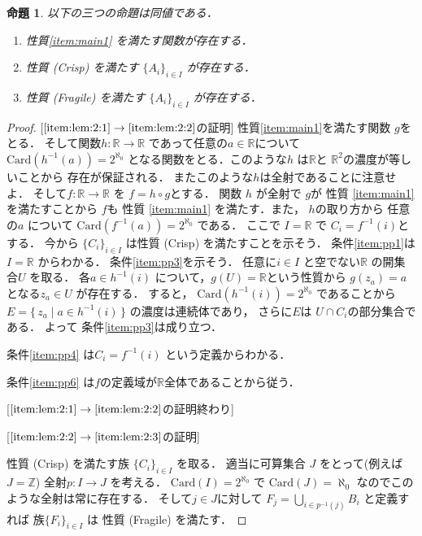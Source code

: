 \documentclass[leqno, a4paper, 12pt]{jsarticle}
\newtheorem{prop}[thm]{命題}
\theoremstyle{definition}
\newcommand{\zz}{\mathbb{Z}}
\newcommand{\rr}{\mathbb{R}}
\newcommand{\card}{\mathrm{Card}}
\newcommand{\myco}{2^{\aleph_{0}}}
\newcommand{\mysei}{\textup{(Crisp)}}
\newcommand{\mysq}{\textup{(Fragile)}}
\begin{document}
\begin{prop}\label{prop:333}
以下の三つの命題は同値である．
\begin{enumerate}[label=\textup{(\arabic*)}]
\item\label{item:lem:2:1}
性質\ref{item:main1}
を満たす関数が存在する．

\item\label{item:lem:2:2}
性質
\mysei
を満たす
$\{A_{i}\}_{i\in I}$
が存在する．

\item\label{item:lem:2:3}
性質
\mysq
を満たす
$\{A_{i}\}_{i\in I}$
が存在する．
\end{enumerate}
\end{prop}
\begin{proof}


[$\ref{item:lem:2:1}\to \ref{item:lem:2:2}$の証明]
性質\ref{item:main1}を満たす関数
$g$をとる．
そして関数$h\colon \rr\to \rr$
であって任意の$a\in \rr$について
$\card(h^{-1}(a))=\myco$
となる関数をとる．このような$h$
は$\rr$と
$\rr^{2}$の濃度が等しいことから
存在が保証される．
またこのような$h$は全射であることに注意せよ．
そして$f\colon \rr\to \rr$
を
$f=h\circ g$とする．
関数
$h$
が全射で
$g$が
性質
\ref{item:main1}
を満たすことから
$f$も
性質
\ref{item:main1}
を満たす．また，
$h$の取り方から
任意の$a$
について
$\card(f^{-1}(a))=\myco$
である．
ここで
$I=\rr$
で
$C_{i}=f^{-1}(i)$とする．
今から
$\{C_{i}\}_{i\in I}$
は性質
\mysei
を満たすことを示そう．
条件\ref{item:pp1}は$I=\rr$
からわかる．
条件\ref{item:pp3}を示そう．
任意に$i\in I$
と空でない$\rr$
の開集合$U$
を取る．
各$a\in h^{-1}(i)$
について，$g(U)=\rr$という性質から
$g(z_{a})=a$となる$z_{a}\in U$
が存在する．
すると，
$\card(h^{-1}(i))=\myco$
であることから
$E=\{\, z_{a}\mid a\in h^{-1}(i)\, \}$
の濃度は連続体であり，
さらに$E$は
$U\cap C_{i}$の部分集合である．
よって
条件\ref{item:pp3}は成り立つ．

条件\ref{item:pp4}
は$C_{i}=f^{-1}(i)$
という定義からわかる．


条件\ref{item:pp6}
は$f$の定義域が$\rr$全体であることから従う．

[$\ref{item:lem:2:1}\to \ref{item:lem:2:2}$の証明終わり]


[$\ref{item:lem:2:2}\to \ref{item:lem:2:3}$の証明]

性質
\mysei
を満たす族
$\{C_{i}\}_{i\in I}$
を取る．
適当に可算集合
$J$
をとって(例えば$J=\zz$)
全射$p\colon I\to J$
を考える．
$\card(I)=\myco$
で
$\card(J)=\aleph_{0}$
なのでこのような全射は常に存在する．
そして$j\in J$に対して
$F_{j}=\bigcup_{i\in p^{-1}(j)}B_{i}$
と定義すれば
族$\{F_{i}\}_{i\in I}$
は
性質
\mysq
を満たす．


\end{proof}
\end{document}
